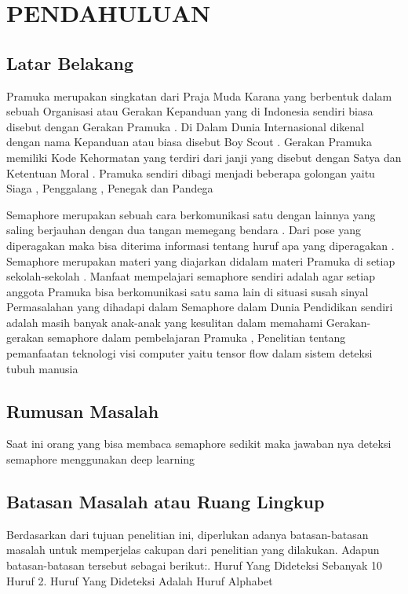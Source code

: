 \section{PENDAHULUAN}

\subsection{Latar Belakang}

Pramuka merupakan singkatan dari Praja Muda Karana yang berbentuk dalam sebuah Organisasi atau Gerakan Kepanduan yang di Indonesia sendiri biasa disebut dengan Gerakan Pramuka . Di Dalam Dunia Internasional dikenal dengan nama Kepanduan atau biasa disebut Boy Scout . Gerakan Pramuka memiliki Kode Kehormatan yang terdiri dari janji yang disebut dengan Satya dan Ketentuan Moral . Pramuka sendiri dibagi menjadi beberapa golongan yaitu Siaga , Penggalang , Penegak dan Pandega 
 

 Semaphore merupakan sebuah cara berkomunikasi satu dengan lainnya yang saling berjauhan dengan dua tangan memegang bendara . Dari pose yang diperagakan maka bisa diterima informasi tentang huruf apa yang diperagakan . Semaphore merupakan materi yang diajarkan didalam materi Pramuka di setiap sekolah-sekolah . Manfaat mempelajari semaphore sendiri adalah agar setiap anggota Pramuka bisa berkomunikasi satu sama lain di situasi susah sinyal 
 Permasalahan yang dihadapi dalam Semaphore dalam Dunia Pendidikan sendiri adalah masih banyak anak-anak yang kesulitan dalam memahami Gerakan-gerakan semaphore dalam pembelajaran Pramuka , Penelitian tentang pemanfaatan teknologi visi computer yaitu tensor flow dalam sistem deteksi tubuh manusia


\subsection{Rumusan Masalah}

Saat ini orang yang bisa membaca semaphore sedikit maka jawaban nya deteksi semaphore menggunakan deep learning  \lipsum[4]

\subsection{Batasan Masalah atau Ruang Lingkup}

Berdasarkan dari tujuan penelitian ini, diperlukan adanya batasan-batasan masalah untuk memperjelas cakupan dari penelitian yang dilakukan. Adapun batasan-batasan tersebut sebagai berikut:. Huruf Yang Dideteksi Sebanyak 10 Huruf
2. Huruf Yang Dideteksi Adalah Huruf Alphabet 

